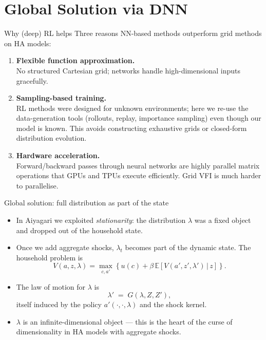 \documentclass[10pt,english,aspectratio=169]{beamer}
\begin{document}

\section{Global Solution via DNN}

\begin{frame}{Why (deep) RL helps}
Three reasons NN-based methods outperform grid methods on HA models:
\medskip
\begin{enumerate}
\item \textbf{Flexible function approximation.}\\
No structured Cartesian grid; networks handle high-dimensional inputs gracefully.
\medskip
\item \textbf{Sampling-based training.}\\
RL methods were designed for unknown environments; here we re-use the data-generation tools (rollouts, replay, importance sampling) even though our model is known. This avoids constructing exhaustive grids or closed-form distribution evolution.
\medskip
\item \textbf{Hardware acceleration.}\\
Forward/backward passes through neural networks are highly parallel matrix operations that GPUs and TPUs execute efficiently. Grid VFI is much harder to parallelise.
\end{enumerate}
\end{frame}

\begin{frame}{Global solution: full distribution as part of the state}
\begin{itemize}
\item In Aiyagari we exploited \emph{stationarity}: the distribution $\lambda$ was a fixed object and dropped out of the household state.
\medskip
\item Once we add aggregate shocks, $\lambda_t$ becomes part of the dynamic state. The household problem is
\[
V(a, z, \lambda) = \max_{c,a'}\!\left\{u(c) + \beta\,\mathbb{E}\!\left[V(a', z', \lambda')\,|\,z\right]\right\}.
\]
\item The law of motion for $\lambda$ is
\[
\lambda' \;=\; G(\lambda, Z, Z'),
\]
itself induced by the policy $a'(\cdot, \cdot, \lambda)$ and the shock kernel.
\item $\lambda$ is an infinite-dimensional object --- this is the heart of the curse of dimensionality in HA models with aggregate shocks.
\end{itemize}
\end{frame}
\end{document}
